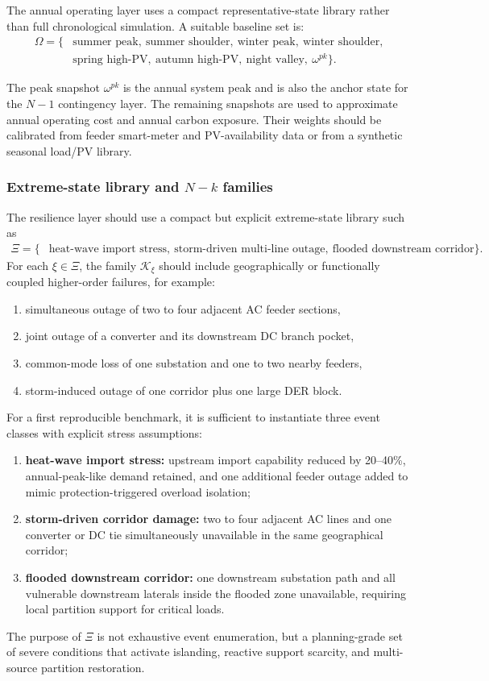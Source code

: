 The annual operating layer uses a compact representative-state library rather than full chronological simulation. A suitable baseline set is:
\begin{align}
\Omega = \{&\text{summer peak},\ \text{summer shoulder},\ \text{winter peak},\ \text{winter shoulder},\\
&\text{spring high-PV},\ \text{autumn high-PV},\ \text{night valley},\ \omega^{pk}\}.
\end{align}

The peak snapshot \(\omega^{pk}\) is the annual system peak and is also the anchor state for the \(N{-}1\) contingency layer. The remaining snapshots are used to approximate annual operating cost and annual carbon exposure. Their weights should be calibrated from feeder smart-meter and PV-availability data or from a synthetic seasonal load/PV library.

\subsubsection{Extreme-state library and \texorpdfstring{$N{-}k$}{N-k} families}

The resilience layer should use a compact but explicit extreme-state library such as
\begin{align}
\Xi = \{&\text{heat-wave import stress},\ \text{storm-driven multi-line outage},\ \text{flooded downstream corridor}\}.
\end{align}
For each \(\xi\in\Xi\), the family \(\mathcal{K}_\xi\) should include geographically or functionally coupled higher-order failures, for example:
\begin{enumerate}
  \item simultaneous outage of two to four adjacent AC feeder sections,
  \item joint outage of a converter and its downstream DC branch pocket,
  \item common-mode loss of one substation and one to two nearby feeders,
  \item storm-induced outage of one corridor plus one large DER block.
\end{enumerate}
For a first reproducible benchmark, it is sufficient to instantiate three event classes with explicit stress assumptions:
\begin{enumerate}
  \item \textbf{heat-wave import stress:} upstream import capability reduced by 20--40\%, annual-peak-like demand retained, and one additional feeder outage added to mimic protection-triggered overload isolation;
  \item \textbf{storm-driven corridor damage:} two to four adjacent AC lines and one converter or DC tie simultaneously unavailable in the same geographical corridor;
  \item \textbf{flooded downstream corridor:} one downstream substation path and all vulnerable downstream laterals inside the flooded zone unavailable, requiring local partition support for critical loads.
\end{enumerate}
The purpose of \(\Xi\) is not exhaustive event enumeration, but a planning-grade set of severe conditions that activate islanding, reactive support scarcity, and multi-source partition restoration.

